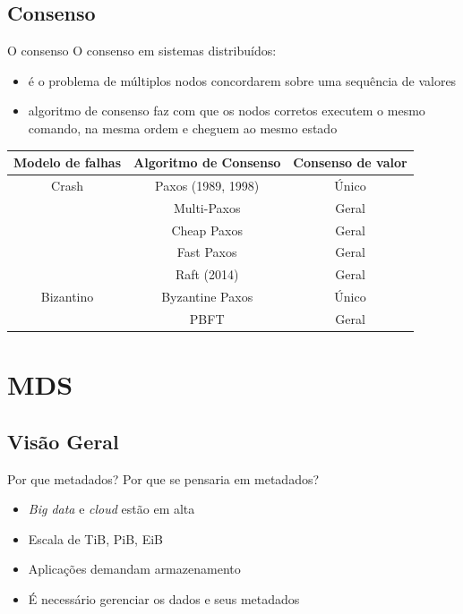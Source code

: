 \documentclass[xcolor=dvipsnames,table]{beamer}
\begin{document}
\subsection{Consenso}
\begin{frame}{O consenso}
	O consenso em sistemas distribuídos:
	\begin{itemize}
		\item é o problema de múltiplos nodos concordarem sobre uma sequência de valores
		\item algoritmo de consenso faz com que os nodos corretos executem o mesmo comando, na mesma ordem e cheguem ao mesmo estado
	\end{itemize} \pause

	\begin{center}
		\begin{tabular}{|c|c|c|}
			\hline
			\textbf{Modelo de falhas} & \textbf{Algoritmo de Consenso} & \textbf{Consenso de valor} \\
			\hline
			\hline
			Crash & Paxos (1989, 1998) & Único \\
				& Multi-Paxos & Geral \\
				& Cheap Paxos & Geral \\
				& Fast Paxos & Geral \\
				& Raft (2014) & Geral \\
			\hline
			Bizantino & Byzantine Paxos & Único \\
				& PBFT & Geral \\
			\hline
		\end{tabular}
	\end{center}
\end{frame}


\section{MDS}
\subsection{Visão Geral}
\begin{frame}{Por que metadados?}
	Por que se pensaria em metadados?
	\begin{itemize}
		\item \textit{Big data} e \textit{cloud} estão em alta
		\item Escala de TiB, PiB, EiB
		\item Aplicações demandam armazenamento
		\item É necessário gerenciar os dados e seus metadados
	\end{itemize}
\end{frame}
\end{document}
